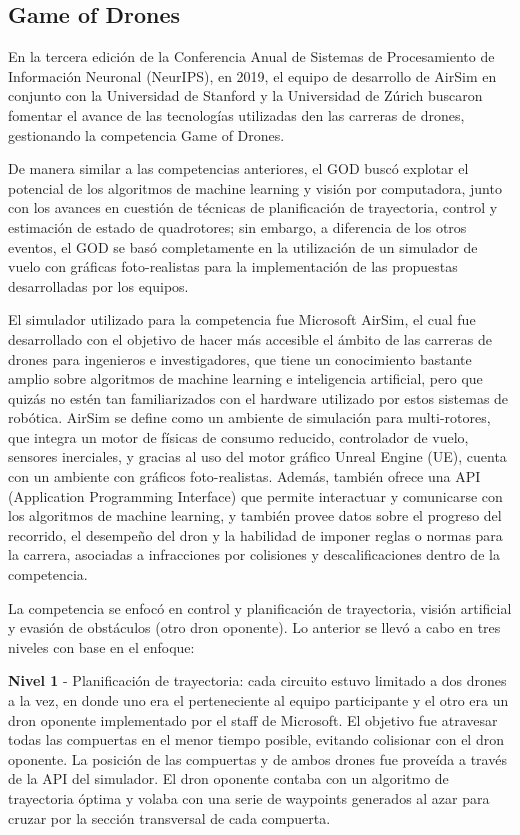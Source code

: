 \subsection{Game of Drones}
En la tercera edición de la Conferencia Anual de Sistemas de Procesamiento de Información Neuronal (NeurIPS), en 2019, el equipo de desarrollo de AirSim\cite{foehn2020alphapilot} en conjunto con la Universidad de Stanford y la Universidad de Zúrich buscaron fomentar el avance de las tecnologías utilizadas den las carreras de drones, gestionando la competencia Game of Drones.

De manera similar a las competencias anteriores, el GOD buscó explotar el potencial de los algoritmos de machine learning y visión por computadora, junto con los avances en cuestión de técnicas de planificación de trayectoria, control y estimación de estado de quadrotores; sin embargo, a diferencia de los otros eventos, el GOD se basó completamente en la utilización de un simulador de vuelo con gráficas foto-realistas para la implementación de las propuestas desarrolladas por los equipos. 

El simulador utilizado para la competencia  fue Microsoft AirSim\cite{airsim2017fsr}, el cual fue desarrollado con el objetivo de hacer más accesible el ámbito de las carreras de drones para ingenieros e investigadores, que tiene un conocimiento bastante amplio sobre algoritmos de machine learning e inteligencia artificial, pero que quizás no estén tan familiarizados con el hardware utilizado por estos sistemas de robótica. AirSim se define como un ambiente de simulación para multi-rotores, que integra un motor de físicas de consumo reducido, controlador de vuelo, sensores inerciales, y gracias al uso del motor gráfico Unreal Engine (UE), cuenta con un ambiente con gráficos foto-realistas. Además, también ofrece una API (Application Programming Interface) que permite interactuar y comunicarse con los algoritmos de machine learning, y también provee datos sobre el progreso del recorrido, el desempeño del dron y la habilidad de imponer reglas o normas para la carrera, asociadas a infracciones por colisiones y descalificaciones dentro de la competencia.

La competencia se enfocó en control y planificación de trayectoria, visión artificial y evasión de obstáculos (otro dron oponente). Lo anterior se llevó a cabo en tres niveles con base en el enfoque: 

\textbf{Nivel 1} - Planificación de trayectoria: cada circuito estuvo limitado a dos drones a la vez, en donde uno era el perteneciente al equipo participante y el otro era un dron oponente implementado por el staff de Microsoft. El objetivo fue atravesar todas las compuertas en el menor tiempo posible, evitando colisionar con el dron oponente. La posición de las compuertas y de ambos drones fue proveída a través de la API del simulador. El dron oponente contaba con un algoritmo de trayectoria óptima y volaba con una serie de waypoints generados al azar para cruzar por la sección transversal de cada compuerta.

